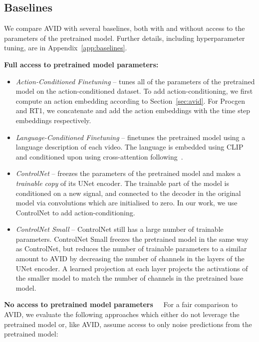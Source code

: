 \subsection{Baselines}
\label{sec:baselines}
We compare AVID with several baselines, both with and without access to the parameters of the pretrained model. Further details, including hyperparameter tuning, are in Appendix~\ref{app:baselines}.

\textbf{Full access to pretrained model parameters:}
\begin{itemize}[leftmargin=*, topsep=0pt]
\setlength\itemsep{0.3mm}
    \item \textit{Action-Conditioned Finetuning} -- tunes all of the parameters of the pretrained model on the action-conditioned dataset. To add action-conditioning, we first compute an action embedding according to Section~\ref{sec:avid}. For Procgen and RT1, we concatenate and add the action embeddings with the time step embeddings respectively. 
    \item \textit{Language-Conditioned Finetuning} -- finetunes the pretrained model using a language description of each video. The language is embedded using CLIP~\citep{radford2021learning} and conditioned upon using cross-attention following~\cite{xing2023dynamicrafter}.
    \item \textit{ControlNet} \citep{zhang2023adding} -- freezes the parameters of the pretrained model  and makes a \textit{trainable copy}  of its UNet encoder. The trainable part of the model is conditioned on a new signal, and connected to the decoder in the original model via convolutions which are initialised to zero. In our work, we use ControlNet to add action-conditioning. 
    \item \textit{ControlNet Small} -- ControlNet still has a large number of trainable parameters. ControlNet Small freezes the pretrained model in the same way as ControlNet, but reduces the number of trainable parameters to a similar amount to AVID by decreasing the number of channels in the layers of the UNet encoder. A learned projection at each layer projects the activations of the smaller model to match the number of channels in the pretrained base model.
\end{itemize}
\textbf{No access to pretrained model parameters\ \ } For a fair comparison to AVID, we evaluate the following approaches which either do not leverage the pretrained model or, like AVID, assume access to only noise predictions from the pretrained model:
